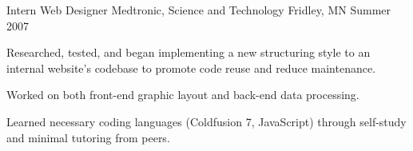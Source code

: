 \cventry
{Intern Web Designer} %
{Medtronic, Science and Technology} %
{Fridley, MN} %
{Summer 2007} %
{
  	\begin{cvitems} %
        \item {Researched, tested, and began implementing a new structuring style to an internal website’s codebase to promote code reuse and reduce maintenance.}
		\item {Worked on both front-end graphic layout and back-end data processing.}
		\item {Learned necessary coding languages (Coldfusion 7, JavaScript) through self-study and minimal tutoring from peers.}
	\end{cvitems}
}